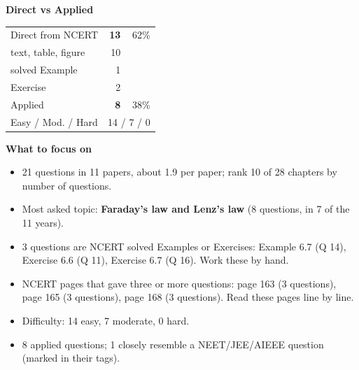 \begin{minipage}[t]{0.34\linewidth}{\small\textbf{\color{crimson}Direct vs Applied}\par\smallskip
\begin{tabular}{@{}lrr@{}}\toprule
Direct from NCERT & \textbf{13} & 62\%\\
\quad text, table, figure & 10 &\\
\quad solved Example & 1 &\\
\quad Exercise & 2 &\\
Applied & \textbf{8} & 38\%\\\midrule
Easy / Mod. / Hard & \multicolumn{2}{r}{14 / 7 / 0}\\\bottomrule
\end{tabular}}\end{minipage}\hfill
\begin{minipage}[t]{0.63\linewidth}{\small\textbf{\color{crimson}What to focus on}\par\smallskip
\begin{itemize}[leftmargin=1.1em,itemsep=1pt,topsep=0pt]
\item 21 questions in 11 papers, about 1.9 per paper; rank 10 of 28 chapters by number of questions.
\item Most asked topic: \textbf{Faraday's law and Lenz's law} (8 questions, in 7 of the 11 years).
\item 3 questions are NCERT solved Examples or Exercises: Example 6.7 (Q 14), Exercise 6.6 (Q 11), Exercise 6.7 (Q 16). Work these by hand.
\item NCERT pages that gave three or more questions: page 163 (3 questions), page 165 (3 questions), page 168 (3 questions). Read these pages line by line.
\item Difficulty: 14 easy, 7 moderate, 0 hard.
\item 8 applied questions; 1 closely resemble a NEET/JEE/AIEEE question (marked in their tags).
\end{itemize}}\end{minipage}\par
{}
